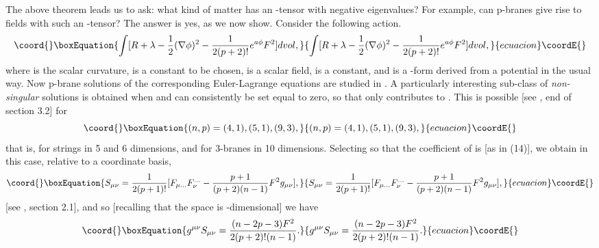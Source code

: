 \documentclass[a4paper,12pt]{article}
\theoremstyle{definition}
\renewcommand{\u}{\textit}
\renewcommand{\-}{\myHighlight{$\dfrac{\quad\enspace}{\quad}$}\coordHE{}}
\begin{document}
The above theorem leads us to ask: what kind of matter has an \coordHE{}-tensor with negative
eigenvalues? For example, can p-branes give rise to fields with such an \coordHE{}-tensor? The
answer is yes, as we now show. Consider the following action.
\begin{equation*}\coord{}\boxEquation{
\int [R+\lambda-\frac{1}{2}(\nabla\phi)^2-\frac{1}{2(p+2)!}e^{a\phi}F^2]dvol,
}{
\int [R+\lambda-\frac{1}{2}(\nabla\phi)^2-\frac{1}{2(p+2)!}e^{a\phi}F^2]dvol,
}{ecuacion}\coordE{}\end{equation*}
where \coordHE{} is the scalar curvature, \myHighlight{$\lambda$}\coordHE{} is a constant to be chosen, \myHighlight{$\phi$}\coordHE{} is a scalar
field, \coordHE{} is a constant, and \coordHE{} is a \coordHE{}-form derived from a potential in the usual
way. Now p-brane solutions of the corresponding Euler-Lagrange equations are studied in
\cite{22}. A particularly interesting sub-class of \u{non-singular} solutions is obtained
when \myHighlight{$\phi$}\coordHE{} and \coordHE{} can consistently be set equal to zero, so that only \coordHE{} contributes to
\coordHE{}. This is possible [see \cite{22}, end of section 3.2] for
\begin{equation*}\coord{}\boxEquation{
(n,p) = (4,1), (5,1), (9,3),
}{
(n,p) = (4,1), (5,1), (9,3),
}{ecuacion}\coordE{}\end{equation*}
that is, for strings in 5 and 6 dimensions, and for 3-branes in 10 dimensions. Selecting
\myHighlight{$\lambda$}\coordHE{} so that the coefficient of \coordHE{} is \coordHE{} [as in (14)], we obtain in this case,
relative to a coordinate basis,
\begin{equation*}\coord{}\boxEquation{
S_{\mu\nu}=\frac{1}{2(p+1)!}[F_{\mu...}F_{\nu}^{...}-\frac{p+1}{(p+2)(n-1)}F^2g_{\mu\nu}],
}{
S_{\mu\nu}=\frac{1}{2(p+1)!}[F_{\mu...}F_{\nu}^{...}-\frac{p+1}{(p+2)(n-1)}F^2g_{\mu\nu}],
}{ecuacion}\coordE{}\end{equation*}
[see \cite{22}, section 2.1], and so [recalling that the space is \coordHE{}-dimensional]
we have
\begin{equation*}\coord{}\boxEquation{
g^{\mu\nu}S_{\mu\nu}=\frac{(n-2p-3)F^2}{2(p+2)!(n-1)}.
}{
g^{\mu\nu}S_{\mu\nu}=\frac{(n-2p-3)F^2}{2(p+2)!(n-1)}.
}{ecuacion}\coordE{}\end{equation*}
\end{document}
